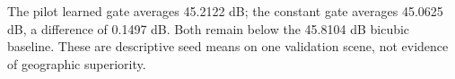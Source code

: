 The pilot learned gate averages 45.2122 dB; the constant gate averages 45.0625 dB, a difference of 0.1497 dB. Both remain below the 45.8104 dB bicubic baseline. These are descriptive seed means on one validation scene, not evidence of geographic superiority.
